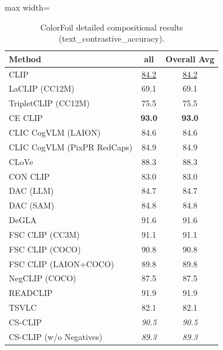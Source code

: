 \begin{table}[t]
  \centering
  \scriptsize
  \caption{ColorFoil detailed compositional results (text_contrastive_accuracy).}
  \label{tab:ColorFoil_detailed}
  \begin{adjustbox}{max width=\textwidth}
  \setlength{\tabcolsep}{2pt}
  \begin{tabular}{p{5cm}c|c}
    \toprule
    Method & all & Overall Avg \\
    \midrule
    CLIP & \underline{84.2} & \underline{84.2} \\
    \midrule
    LaCLIP (CC12M) & 69.1 & 69.1 \\
    TripletCLIP (CC12M) & 75.5 & 75.5 \\
    \midrule
    CE CLIP & \textbf{93.0} & \textbf{93.0} \\
    CLIC CogVLM (LAION) & 84.6 & 84.6 \\
    CLIC CogVLM (PixPR RedCaps) & 84.9 & 84.9 \\
    CLoVe & 88.3 & 88.3 \\
    CON CLIP & 83.0 & 83.0 \\
    DAC (LLM) & 84.7 & 84.7 \\
    DAC (SAM) & 84.8 & 84.8 \\
    DeGLA & 91.6 & 91.6 \\
    FSC CLIP (CC3M) & 91.1 & 91.1 \\
    FSC CLIP (COCO) & 90.8 & 90.8 \\
    FSC CLIP (LAION+COCO) & 89.8 & 89.8 \\
    NegCLIP (COCO) & 87.5 & 87.5 \\
    READCLIP & 91.9 & 91.9 \\
    TSVLC & 82.1 & 82.1 \\
    \midrule
    CS-CLIP & \emph{90.5} & \emph{90.5} \\
    CS-CLIP (w/o Negatives) & \emph{89.3} & \emph{89.3} \\
    \bottomrule
  \end{tabular}
  \end{adjustbox}
\end{table}